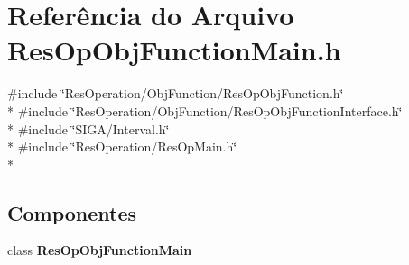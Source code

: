 \section{Referência do Arquivo Res\+Op\+Obj\+Function\+Main.\+h}
\label{_res_op_obj_function_main_8h}
{\ttfamily \#include \char`\"{}Res\+Operation/\+Obj\+Function/\+Res\+Op\+Obj\+Function.\+h\char`\"{}}\\*
{\ttfamily \#include \char`\"{}Res\+Operation/\+Obj\+Function/\+Res\+Op\+Obj\+Function\+Interface.\+h\char`\"{}}\\*
{\ttfamily \#include \char`\"{}S\+I\+G\+A/\+Interval.\+h\char`\"{}}\\*
{\ttfamily \#include \char`\"{}Res\+Operation/\+Res\+Op\+Main.\+h\char`\"{}}\\*
\subsection*{Componentes}
\begin{DoxyCompactItemize}
\item 
class {\bf Res\+Op\+Obj\+Function\+Main}
\end{DoxyCompactItemize}
